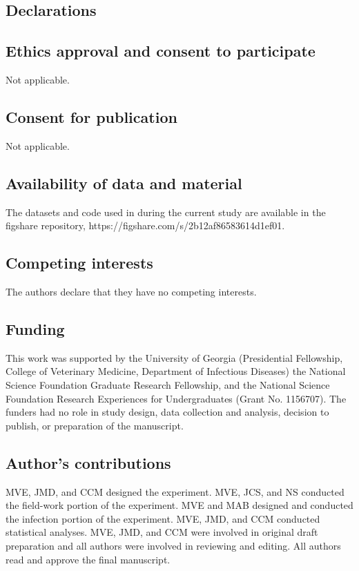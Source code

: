 \documentclass[doublespacing, linenumbers]{bmcart}
\begin{document}
\begin{backmatter}

\section*{Declarations}
\subsection*{Ethics approval and consent to participate}
Not applicable.

\subsection*{Consent for publication}
Not applicable.

\subsection*{Availability of data and material}
The datasets and code used in during the current study are available in the figshare repository, https://figshare.com/s/2b12af86583614d1ef01.

\subsection*{Competing interests}
  The authors declare that they have no competing interests.

\subsection*{Funding}
This work was supported by the University of Georgia (Presidential Fellowship, College of Veterinary Medicine, Department of Infectious Diseases) the National Science Foundation Graduate Research Fellowship, and the National Science Foundation Research Experiences for Undergraduates (Grant No. 1156707). The funders had no role in study design, data collection and analysis, decision to publish, or preparation of the manuscript.

\subsection*{Author's contributions}
    MVE, JMD, and CCM designed the experiment. MVE, JCS, and NS conducted the field-work portion of the experiment. MVE and MAB designed and conducted the infection portion of the experiment. MVE, JMD, and CCM conducted statistical analyses. MVE, JMD, and CCM were involved in original draft preparation and all authors were involved in reviewing and editing.  All authors read and approve the final manuscript.


\end{backmatter}
\end{document}
